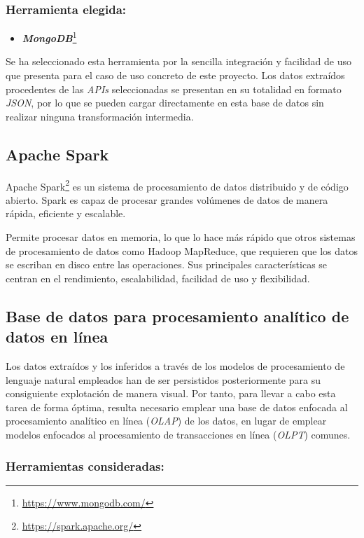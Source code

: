 \subsubsection{Herramienta elegida:}

\begin{itemize}
    \item \textbf{\textit{MongoDB}}\footnote{\url{https://www.mongodb.com/}}
\end{itemize}

Se ha seleccionado esta herramienta por la sencilla integración y facilidad de uso que presenta para el caso de uso concreto de este proyecto. Los datos extraídos procedentes de las \textit{APIs} seleccionadas se presentan en su totalidad en formato \textit{JSON}, por lo que se pueden cargar directamente en esta base de datos sin realizar ninguna transformación intermedia. 

\subsection{Apache Spark}

Apache Spark\footnote{\url{https://spark.apache.org/}} es un sistema de procesamiento de datos distribuido y de código abierto. Spark es capaz de procesar grandes volúmenes de datos de manera rápida, eficiente y escalable.

Permite procesar datos en memoria, lo que lo hace más rápido que otros sistemas de procesamiento de datos como Hadoop MapReduce, que requieren que los datos se escriban en disco entre las operaciones. Sus principales características se centran en el rendimiento, escalabilidad, facilidad de uso y flexibilidad.

\subsection{Base de datos para procesamiento analítico de datos en línea}

Los datos extraídos y los inferidos a través de los modelos de procesamiento de lenguaje natural empleados han de ser persistidos posteriormente para su consiguiente explotación de manera visual. Por tanto, para llevar a cabo esta tarea de forma óptima, resulta necesario emplear una base de datos enfocada al procesamiento analítico en línea (\textit{OLAP}) de los datos, en lugar de emplear modelos enfocados al procesamiento de transacciones en línea (\textit{OLPT}) comunes.

\subsubsection{Herramientas consideradas:}

